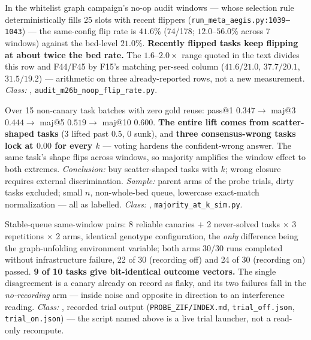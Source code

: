 \begin{description}[leftmargin=0pt,labelindent=0pt,labelsep=0pt,style=nextline,font=\normalfont,itemsep=6pt]
\item[\textbf{F41}\quad Volatile-family persistence --- the noise is not
      uniform.]
In the whitelist graph campaign's no-op audit windows --- whose selection
rule deterministically fills 25 slots with recent flippers
(\texttt{run\_meta\_aegis.py:1039--1043}) --- the same-config flip rate is
\textbf{$41.6\%$} (74/178; $12.0$--$56.0\%$ across 7 windows) against the
bed-level $21.0\%$. \textbf{Recently flipped tasks keep flipping at about
twice the bed rate.} The $1.6$--$2.0\times$ range quoted in the text divides this row and F44/F45 by F15's matching per-seed column ($41.6/21.0$, $37.7/20.1$, $31.5/19.2$) --- arithmetic on three already-reported  rows, not a new measurement. \emph{Class:} ,
\texttt{audit\_m26b\_noop\_flip\_rate.py}.

\item[\textbf{F42}\quad Offline majority-at-$k$ simulation.]
Over 15 non-canary task batches with zero gold reuse: pass@1 $0.347 \to$
maj@3 $0.444 \to$ maj@5 $0.519 \to$ maj@10 $0.600$. \textbf{The entire
lift comes from scatter-shaped tasks} (3 lifted past $0.5$, 0 sunk), and
\textbf{three consensus-wrong tasks lock at $0.00$ for every $k$} ---
voting hardens the confident-wrong answer. The same task's shape flips
across windows, so majority amplifies the window effect to both extremes.
\emph{Conclusion:} buy scatter-shaped tasks with $k$; wrong closure
requires external discrimination. \emph{Sample:} parent arms of the probe
trials, dirty tasks excluded; small $n$, non-whole-bed queue,
lowercase exact-match normalization --- all as labelled.
\emph{Class:} , \texttt{majority\_at\_k\_sim.py}.

\item[\textbf{F43}\quad Zero-interference replay.]
Stable-queue same-window pairs: 8 reliable canaries $+$ 2 never-solved
tasks $\times$ 3 repetitions $\times$ 2 arms, identical genotype
configuration, the \emph{only} difference being the graph-unfolding
environment variable; both arms 30/30 runs completed without
infrastructure failure, 22 of 30 (recording off) and 24 of 30 (recording
on) passed.
\textbf{9 of 10 tasks give bit-identical outcome vectors.} The single
disagreement is a canary already on record as flaky, and its two failures
fall in the \emph{no-recording} arm --- inside noise and opposite in
direction to an interference reading. \emph{Class:} , recorded
trial output (\texttt{PROBE\_ZIF/INDEX.md}, \texttt{trial\_off.json},
\texttt{trial\_on.json}) --- the script named above is a live trial
launcher, not a read-only recompute.


\end{description}
